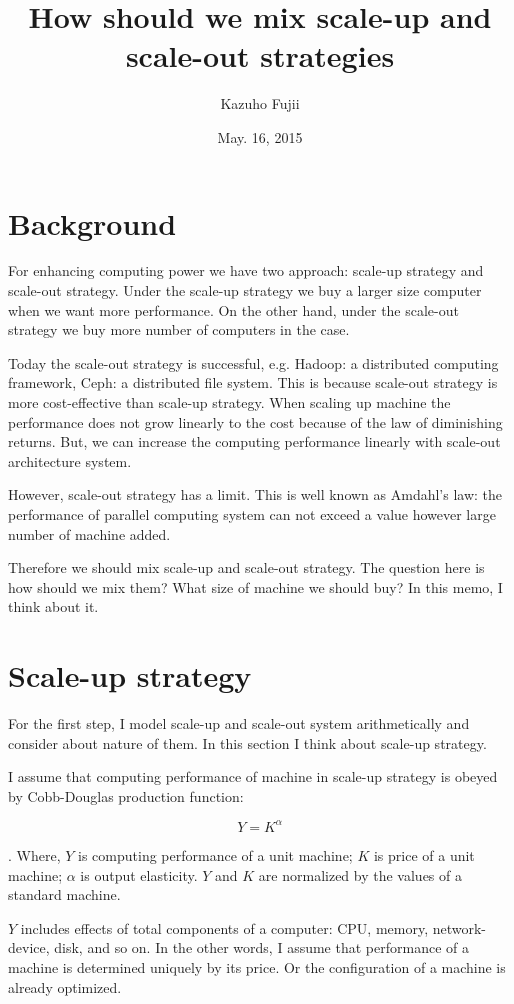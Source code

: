 \documentclass[a4paper,11pt]{article}
\title{How should we mix scale-up and scale-out strategies}
\author{Kazuho Fujii}
\date{May. 16, 2015}
\begin{document}
\maketitle

\section{Background}

For enhancing computing power we have two approach: scale-up strategy and 
scale-out strategy. Under the scale-up strategy we buy a larger size computer
when we want more performance. On the other hand, under the scale-out strategy
 we buy more number of computers in the case.

Today the scale-out strategy is successful, e.g. Hadoop: a distributed
computing framework, Ceph: a distributed file system. This is because 
scale-out strategy is more cost-effective than scale-up strategy. When scaling 
up machine the performance does not grow linearly to the cost because of the law
of diminishing returns. But, we can increase the computing performance linearly
with scale-out architecture system.

However, scale-out strategy has a limit. This is well known as Amdahl's law: the
performance of parallel computing system can not exceed a value however large
number of machine added.

Therefore we should mix scale-up and scale-out strategy. The question here is
how should we mix them? What size of machine we should buy? In this memo, I
think about it.

\section{Scale-up strategy}

For the first step, I model scale-up and scale-out system arithmetically and
consider about nature of them. In this section I think about scale-up strategy.

I assume that computing performance of machine in scale-up strategy is obeyed
by Cobb-Douglas production function:

$$
Y = K^\alpha
$$

. Where, $Y$ is computing performance of a unit machine;
$K$ is price of a unit machine; $\alpha$ is output elasticity.
$Y$ and $K$ are normalized by the values of a standard machine.

$Y$ includes effects of total components of a computer: CPU, memory, network-device, disk, and so on.
In the other words, I assume that performance of a machine is determined uniquely by its price.
Or the configuration of a machine is already optimized. 
\end{document}
